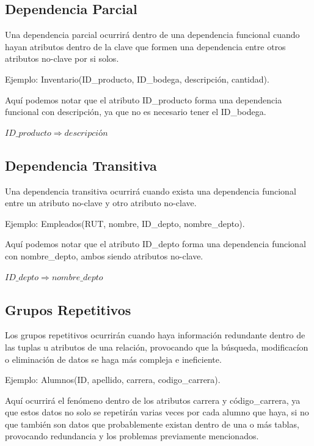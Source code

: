 \documentclass[12pt]{article}
\begin{document}
\subsection*{Dependencia Parcial}
Una dependencia parcial ocurrirá dentro de una dependencia funcional cuando hayan 
atributos dentro de la clave que formen una dependencia entre otros atributos 
no-clave por si solos.
\begin{center}
Ejemplo: Inventario(ID\_producto, ID\_bodega, descripción, cantidad).
\end{center}
Aquí podemos notar que el atributo ID\_producto forma una dependencia funcional con
descripción, ya que no es necesario tener el ID\_bodega.
\begin{center}
	$ID\_producto \Rightarrow descripción$ 
\end{center}

\subsection*{Dependencia Transitiva}
Una dependencia transitiva ocurrirá cuando exista una dependencia funcional entre un
atributo no-clave y otro atributo no-clave.
\begin{center}
Ejemplo: Empleados(RUT, nombre, ID\_depto, nombre\_depto).
\end{center}
Aquí podemos notar que el atributo ID\_depto forma una dependencia funcional con
nombre\_depto, ambos siendo atributos no-clave.
\begin{center}
	$ID\_depto \Rightarrow nombre\_depto$ 
\end{center}

\subsection*{Grupos Repetitivos}
Los grupos repetitivos ocurrirán cuando haya información redundante dentro de las tuplas
u atributos de una relación, provocando que la búsqueda, modificacíon o eliminación de
datos se haga más compleja e ineficiente.

\begin{center}
Ejemplo: Alumnos(ID, apellido, carrera, codigo\_carrera).
\end{center}
Aquí ocurrirá el fenómeno dentro de los atributos carrera y código\_carrera, ya que estos
datos no solo se repetirán varias veces por cada alumno que haya, si no que también son
datos que probablemente existan dentro de una o más tablas, provocando redundancia y los
problemas previamente mencionados.
\end{document}

